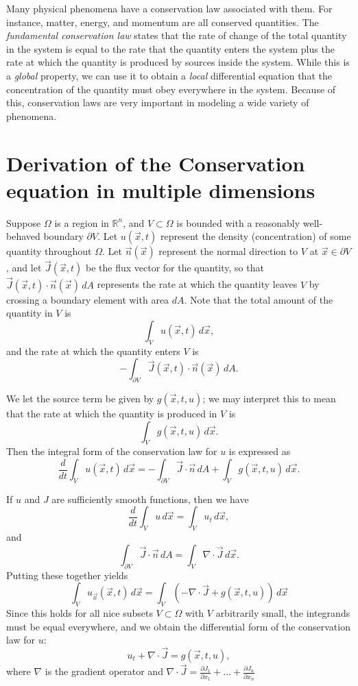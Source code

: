 \label{lab:HeatFlow}

Many physical phenomena have a conservation law associated with them.
For instance, matter, energy, and momentum are all conserved quantities.
The \textit{fundamental conservation law} states that the rate of change of the total quantity in the system is equal to the rate that the quantity enters the system plus the rate at which the quantity is produced by sources inside the system.
While this is a \textit{global} property, we can use it to obtain a \textit{local} differential equation that the concentration of the quantity must obey everywhere in the system.
Because of this, conservation laws are very important in modeling a wide variety of phenomena.

\section*{Derivation of the Conservation equation in multiple dimensions}
Suppose $\Omega$ is a region in $\mathbb{R}^n$, and $V \subset \Omega$ is bounded with a reasonably well-behaved boundary $\partial V$.
Let $u(\vec{x},t)$ represent the density (concentration) of some quantity throughout $\Omega$.
Let $\vec{n}(\vec x)$ represent the normal direction to $V$ at $\vec x \in \partial V$, and let $\vec{J}(\vec{x},t)$ be the flux vector for the quantity, so that $\vec{J}(\vec{x},t) \cdot \vec{n}(\vec x) \, dA$ represents the rate at which the quantity leaves $V$ by crossing a boundary element with area $dA$.
Note that the total amount of the quantity in $V$ is
\[ \int_V u(\vec{x},t)\, d\vec x,\]
and the rate at which the quantity enters $V$ is
\[-\int_{\partial V} \vec{J}(\vec{x},t) \cdot \vec{n}(\vec x) \, dA.\]

We let the source term be given by $g(\vec{x},t,u)$; we may interpret this to mean that the rate at which the quantity is produced in $V$ is
\[\int_V g(\vec{x},t,u)\, d\vec x.\]
Then the integral form of the conservation law for $u$ is expressed as
\[\frac{d}{dt} \int_V u(\vec{x},t) \, d\vec{x} = -\int_{\partial V} \vec{J}\cdot \vec{n}\, dA + \int_V g(\vec{x},t,u)\, d\vec{x}.\]

If $u$ and $J$ are sufficiently smooth functions, then we have
\[ \frac{d}{dt} \int_V u\, d\vec{x} = \int_V u_t \, d\vec{x},\]
and
\[ \int_{\partial V} \vec{J}\cdot \vec{n}\, dA = \int_V \nabla \cdot \vec{J}\, d\vec{x} .\]
Putting these together yields
\[
\int_V u_{\vec x}(\vec x,t)\,d\vec x = \int_V\left(
-\nabla\cdot \vec{J} + g(\vec{x},t,u)
\right)\,d\vec x
\]
Since this holds for all nice subsets $V \subset \Omega$ with $V$ arbitrarily small, the integrands must be equal everywhere, and we obtain the differential form of the conservation law for $u$:
\[ u_t + \nabla \cdot \vec{J} = g(\vec{x},t,u) ,\]
where $\nabla$ is the gradient operator and $\nabla \cdot \vec{J} = \frac{\partial J_1}{\partial x_1} + \dots + \frac{\partial J_n}{\partial x_n}$

